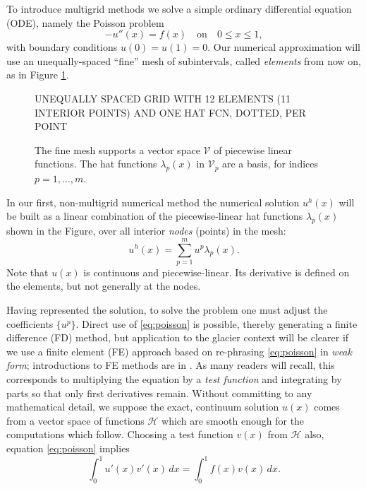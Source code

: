 \documentclass[letterpaper,final,12pt,reqno]{amsart}
\begin{document}
To introduce multigrid methods we solve a simple ordinary differential equation (ODE), namely the Poisson problem
\begin{equation}
- u''(x) = f(x) \quad \text{on} \quad 0 \le x \le 1, \label{eq:poisson}
\end{equation}
with boundary conditions $u(0)=u(1)=0$.  Our numerical approximation will use an unequally-spaced ``fine'' mesh of subintervals, called \emph{elements} from now on, as in Figure \ref{fig:finehats}.

\begin{figure}
UNEQUALLY SPACED GRID WITH 12 ELEMENTS (11 INTERIOR POINTS) AND ONE HAT FCN, DOTTED, PER POINT
\caption{The fine mesh supports a vector space $\mathcal{V}$ of piecewise linear functions.  The hat functions $\lambda_p(x)$ in $\mathcal{V}_p$ are a basis, for indices $p=1,\dots,m$.}
\label{fig:finehats}
\end{figure}

In our first, non-multigrid numerical method the numerical solution $u^h(x)$ will be built as a linear combination of the piecewise-linear hat functions $\lambda_p(x)$ shown in the Figure, over all interior \emph{nodes} (points) in the mesh:
\begin{equation}
u^h(x) = \sum_{p=1}^m u^p \lambda_p(x). \label{eq:trialsolution}
\end{equation}
Note that $u(x)$ is continuous and piecewise-linear.  Its derivative is defined on the elements, but not generally at the nodes.

Having represented the solution, to solve the problem one must adjust the coefficients $\{u^p\}$.  Direct use of \eqref{eq:poisson} is possible, thereby generating a finite difference (FD) method, but application to the glacier context will be clearer if we use a finite element (FE) approach based on re-phrasing \eqref{eq:poisson} in \emph{weak form}; introductions to FE methods are in \cite{Bueler2021,Elmanetal2014}.  As many readers will recall, this corresponds to multiplying the equation by a \emph{test function} and integrating by parts so that only first derivatives remain.  Without committing to any mathematical detail, we suppose the exact, continuum solution $u(x)$ comes from a vector space of functions $\mathcal{H}$ which are smooth enough for the computations which follow.  Choosing a test function $v(x)$ from $\mathcal{H}$ also, equation \eqref{eq:poisson} implies
\begin{equation}
\int_0^1 u'(x) v'(x)\,dx = \int_0^1 f(x) v(x)\, dx.
\label{eq:weakpoisson}
\end{equation}
\end{document}
